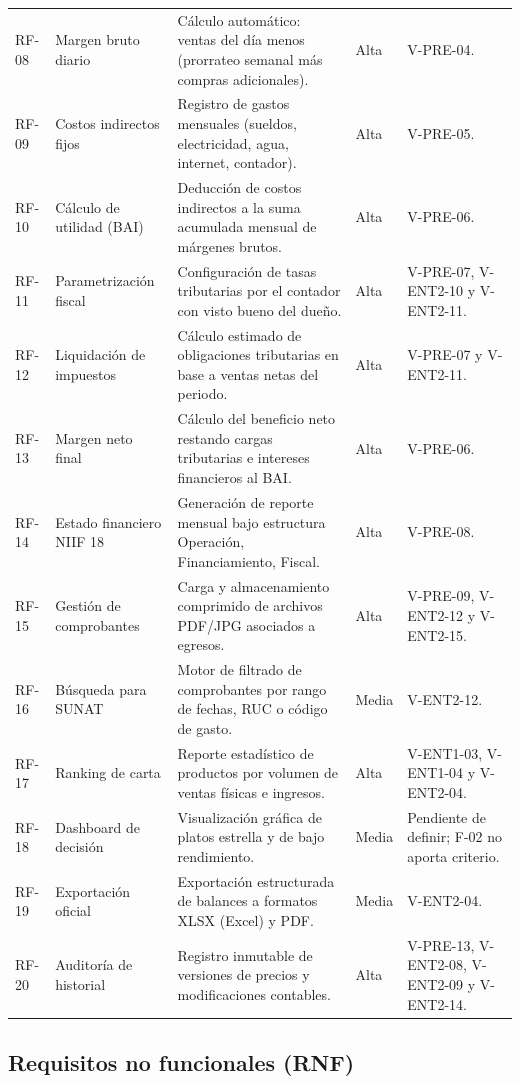{\begin{longtable}{L{1.5cm} L{5.0cm} L{3.2cm} L{1.9cm} L{3.0cm}}
RF-08 & Margen bruto diario & Cálculo automático: ventas del día menos (prorrateo semanal más compras adicionales). & Alta & V-PRE-04. \\
RF-09 & Costos indirectos fijos & Registro de gastos mensuales (sueldos, electricidad, agua, internet, contador). & Alta & V-PRE-05. \\
RF-10 & Cálculo de utilidad (BAI) & Deducción de costos indirectos a la suma acumulada mensual de márgenes brutos. & Alta & V-PRE-06. \\
RF-11 & Parametrización fiscal & Configuración de tasas tributarias por el contador con visto bueno del dueño. & Alta & V-PRE-07, V-ENT2-10 y V-ENT2-11. \\
RF-12 & Liquidación de impuestos & Cálculo estimado de obligaciones tributarias en base a ventas netas del periodo. & Alta & V-PRE-07 y V-ENT2-11. \\
RF-13 & Margen neto final & Cálculo del beneficio neto restando cargas tributarias e intereses financieros al BAI. & Alta & V-PRE-06. \\
RF-14 & Estado financiero NIIF 18 & Generación de reporte mensual bajo estructura Operación, Financiamiento, Fiscal. & Alta & V-PRE-08. \\
RF-15 & Gestión de comprobantes & Carga y almacenamiento comprimido de archivos PDF/JPG asociados a egresos. & Alta & V-PRE-09, V-ENT2-12 y V-ENT2-15. \\
RF-16 & Búsqueda para SUNAT & Motor de filtrado de comprobantes por rango de fechas, RUC o código de gasto. & Media & V-ENT2-12. \\
RF-17 & Ranking de carta & Reporte estadístico de productos por volumen de ventas físicas e ingresos. & Alta & V-ENT1-03, V-ENT1-04 y V-ENT2-04. \\
RF-18 & Dashboard de decisión & Visualización gráfica de platos estrella y de bajo rendimiento. & Media & Pendiente de definir; F-02 no aporta criterio. \\
RF-19 & Exportación oficial & Exportación estructurada de balances a formatos XLSX (Excel) y PDF. & Media & V-ENT2-04. \\
RF-20 & Auditoría de historial & Registro inmutable de versiones de precios y modificaciones contables. & Alta & V-PRE-13, V-ENT2-08, V-ENT2-09 y V-ENT2-14. \\
\end{longtable}
}

\subsection{Requisitos no funcionales (RNF)}
\label{subsec:rnf}

